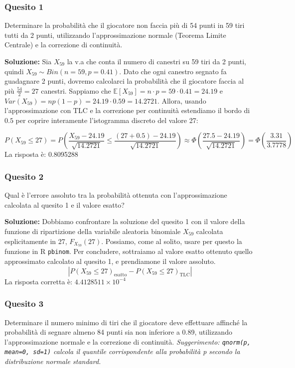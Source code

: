 \documentclass[12pt, a4paper]{article}
\begin{document}
\subsubsection*{Quesito 1}
Determinare la probabilità che il giocatore non faccia più di 54 punti in 59 tiri tutti da 2 punti, utilizzando l’approssimazione normale (Teorema Limite Centrale) e la correzione di continuità.

\textbf{Soluzione:}
Sia $X_{59}$ la v.a che conta il numero di canestri su 59 tiri da 2 punti, quindi $X_{59} \sim Bin(n=59, p=0.41)$. Dato che ogni canestro segnato fa guadagnare 2 punti, dovremo calcolarci la probabilità che il giocatore faccia al più $\frac{54}{2} = 27$ canestri.
Sappiamo che $\mathbb{E}[X_{59}] = n \cdot p = 59 \cdot 0.41 = 24.19$ e $Var(X_{59}) = np(1-p) = 24.19 \cdot 0.59 = 14.2721$.
Allora, usando l’approssimazione con TLC e la correzione per continuità estendiamo il bordo di $0.5$ per coprire interamente l'istogramma discreto del valore 27:

\newpage

$$ P(X_{59} \leq 27) = P\left(\frac{X_{59} - 24.19}{\sqrt{14.2721}} \leq \frac{(27+0.5) - 24.19}{\sqrt{14.2721}}\right) \approx \Phi\left(\frac{27.5 - 24.19}{\sqrt{14.2721}}\right) = \Phi\left(\frac{3.31}{3.7778}\right) $$
La risposta è: 0.8095288

\subsubsection*{Quesito 2}
Qual è l’errore assoluto tra la probabilità ottenuta con l’approssimazione calcolata al quesito 1 e il valore esatto?

\textbf{Soluzione:}
Dobbiamo confrontare la soluzione del quesito 1 con il valore della funzione di ripartizione della variabile aleatoria binomiale $X_{59}$ calcolata esplicitamente in 27, $F_{X_{59}}(27)$. Possiamo, come al solito, usare per questo la funzione in R \texttt{pbinom}.
Per concludere, sottraiamo al valore esatto ottenuto quello approssimato calcolato al quesito 1, e prendiamone il valore assoluto.
$$ |P(X_{59} \leq 27)_{\text{esatto}} - P(X_{59} \leq 27)_{\text{TLC}}| $$
La risposta corretta è: $4.4128511 \times 10^{-4}$

\subsubsection*{Quesito 3}
Determinare il numero minimo di tiri che il giocatore deve effettuare affinché la probabilità di segnare almeno 84 punti sia non inferiore a 0.89, utilizzando l’approssimazione normale e la correzione di continuità.
\textit{Suggerimento: \texttt{qnorm(p, mean=0, sd=1)} calcola il quantile corrispondente alla probabilità p secondo la distribuzione normale standard.}
\end{document}
